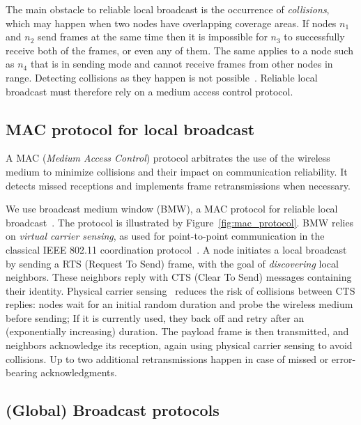 The main obstacle to reliable local broadcast is the occurrence of \emph{collisions}, which may happen when two nodes have overlapping coverage areas.
If nodes $n_{1}$ and $n_{2}$ send frames at the same time then it is impossible for $n_{3}$ to successfully receive both of the frames, or even any of them.
The same applies to a node such as $n_4$ that is in sending mode and cannot receive frames from other nodes in range.
Detecting collisions as they happen is not possible~\citep{ieee1997wireless}.
Reliable local broadcast must therefore rely on a medium access control protocol.

\subsection{MAC protocol for local broadcast}
\label{sec:background:mac}

A MAC (\emph{Medium Access Control}) protocol arbitrates the use of the wireless medium to minimize collisions and their impact on communication reliability.
It detects missed receptions and implements frame retransmissions when necessary.

We use broadcast medium window (BMW), a MAC protocol for reliable local broadcast~\citep{tang2001mac}.
The protocol is illustrated by Figure~\ref{fig:mac_protocol}.
BMW relies on \emph{virtual carrier sensing}, as used for point-to-point communication in the classical IEEE 802.11 coordination protocol~\citep{ieee1997wireless}.
A node initiates a local broadcast by sending a RTS (Request To Send) frame, with the goal of \emph{discovering} local neighbors.
These neighbors reply with CTS (Clear To Send) messages containing their identity.
Physical carrier sensing~\citep{ieee1997wireless} reduces the risk of collisions between CTS replies:
nodes wait for an initial random duration and probe the wireless medium before sending; If it is currently used, they back off and retry after an (exponentially increasing) duration.
The payload frame is then transmitted, and neighbors acknowledge its reception, again using physical carrier sensing to avoid collisions.
Up to two additional retransmissions happen in case of missed or error-bearing acknowledgments.

\subsection{(Global) Broadcast protocols}
\label{sec:background:broadcast}

